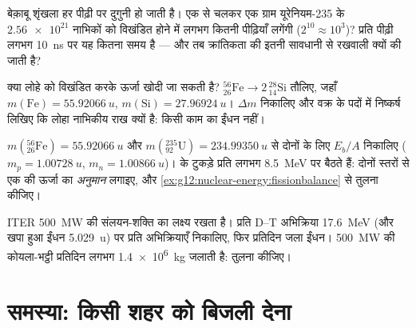 \begin{exercise}[$\star\star\star$]\label{exo:g12:nuclear-energy:12}
बेक़ाबू शृंखला हर पीढ़ी पर दुगुनी हो जाती है। एक  से चलकर एक ग्राम
यूरेनियम-235 के $\num{2.56e21}$ नाभिकों को विखंडित होने में लगभग कितनी पीढ़ियाँ लगेंगी
($2^{10} \approx 10^{3}$)? प्रति पीढ़ी लगभग \qty{10}{ns} पर यह कितना समय है --- और तब क्रांतिकता की
इतनी सावधानी से रखवाली क्यों की जाती है?
\end{exercise}

\begin{exercise}[$\star\star\star$]\label{exo:g12:nuclear-energy:13}
क्या लोहे को विखंडित करके ऊर्जा खोदी जा सकती है? ${}^{56}_{26}\mathrm{Fe} \to 2\,{}^{28}_{14}\mathrm{Si}$ तौलिए, जहाँ
$m(\mathrm{Fe}) = \qty{55.92066}{u}$, $m(\mathrm{Si}) = \qty{27.96924}{u}$। $\Delta m$ निकालिए और वक्र के पदों में निष्कर्ष लिखिए कि लोहा
नाभिकीय राख क्यों है: किसी काम का ईंधन नहीं।
\end{exercise}

\begin{exercise}[$\star\star\star$]\label{exo:g12:nuclear-energy:14}
$m({}^{56}_{26}\mathrm{Fe}) = \qty{55.92066}{u}$ और $m({}^{235}_{92}\mathrm{U}) = \qty{234.99350}{u}$ से दोनों के लिए $E_b/A$ निकालिए ($m_p = \qty{1.00728}{u}$, $m_n = \qty{1.00866}{u}$)।
 के टुकड़े प्रति  लगभग \qty{8.5}{MeV} पर बैठते
हैं: दोनों स्तरों से एक  की ऊर्जा का \emph{अनुमान}
लगाइए, और \cref{ex:g12:nuclear-energy:fissionbalance} से तुलना कीजिए।
\end{exercise}

\begin{exercise}[$\star\star\star$]\label{exo:g12:nuclear-energy:15}
ITER \qty{500}{MW} की संलयन-शक्ति का लक्ष्य रखता है। प्रति D--T
अभिक्रिया \qty{17.6}{MeV} (और खपा हुआ ईंधन \qty{5.029}{u}) पर प्रति  अभिक्रियाएँ
निकालिए, फिर प्रतिदिन जला ईंधन। \qty{500}{MW} की कोयला-भट्ठी प्रतिदिन लगभग \qty{1.4e6}{kg}
जलाती है: तुलना कीजिए।
\end{exercise}

\section{समस्या: किसी शहर को बिजली देना}


